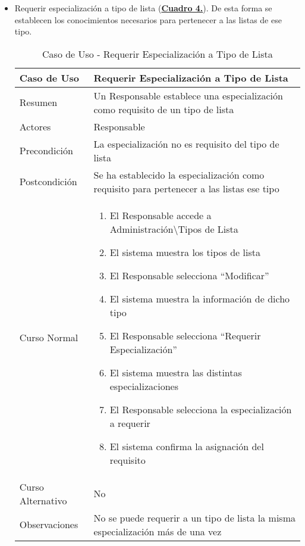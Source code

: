 \begin{itemize}
  \pagebreak
	\item \addtocounter{tabla}{1} Requerir especialización a tipo de lista (\textbf{\hyperref[tab:curRequerirEspecTipoLst]{Cuadro 4.}}). De esta forma se establecen los conocimientos necesarios para pertenecer a las listas de ese tipo.
		\begin{table}[!htbp]
		  \centering  \addtocounter{casouso}{1}
		  \begin{tabular}{|l | p{100mm}|}
		    \textbf{Caso de Uso}  & \textbf{Requerir Especialización a Tipo de Lista} \\ \hline
		    Resumen 		 & Un Responsable establece una especialización como requisito de un tipo de lista \\ \hline
		    Actores  		 & Responsable \\ \hline
		    Precondición  	 & La especialización no es requisito del tipo de lista  \\ \hline
		    Postcondición  	 & Se ha establecido la especialización como requisito para pertenecer a las listas ese tipo \\ \hline
		    Curso Normal   	 & \begin{enumerate}
			  \item El Responsable accede a Administración\textbackslash Tipos de Lista
			  \item El sistema muestra los tipos de lista
			  \item El Responsable selecciona ``Modificar''
			  \item El sistema muestra la información de dicho tipo
			  \item El Responsable selecciona ``Requerir Especialización''
			  \item El sistema muestra las distintas especializaciones
			  \item El Responsable selecciona la especialización a requerir
			  \item El sistema confirma la asignación del requisito
		    \end{enumerate}  \\ \hline
		    Curso Alternativo  & No  \\ \hline
		    Observaciones 	 & No se puede requerir a un tipo de lista la misma especialización más de una vez  \\ \hline
		  \end{tabular}
		  \caption{Caso de Uso  - Requerir Especialización a Tipo de Lista}
		  \label{tab:curRequerirEspecTipoLst}
		\end{table}
		\FloatBarrier
\end{itemize}


